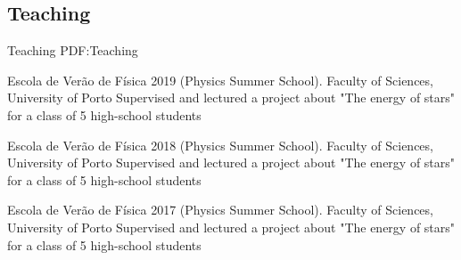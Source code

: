 \documentclass[letterpaper,10pt,oneside]{article}
\begin{document}
\begin{body}







\section
{Teaching}
{Teaching}
{PDF:Teaching}

\BulletItem
Escola de Verão de Física 2019 (Physics Summer School). Faculty of Sciences, University of Porto
\GapNoBreak
\SubBulletItem
Supervised and lectured a project about "The energy of stars" for a class of 5 high-school students

\GapNoBreak
\BulletItem
Escola de Verão de Física 2018 (Physics Summer School). Faculty of Sciences, University of Porto
\GapNoBreak
\SubBulletItem
Supervised and lectured a project about "The energy of stars" for a class of 5 high-school students

\GapNoBreak
\BulletItem
Escola de Verão de Física 2017 (Physics Summer School). Faculty of Sciences, University of Porto
\GapNoBreak
\SubBulletItem
Supervised and lectured a project about "The energy of stars" for a class of 5 high-school students





\end{body}
\end{document}
